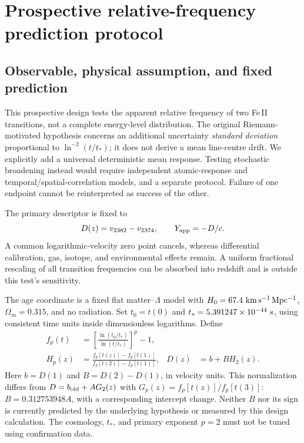 \section{Prospective relative-frequency prediction protocol}
\label{app:prediction}

\subsection{Observable, physical assumption, and fixed prediction}
\label{app:prediction_model}

This prospective design tests the apparent relative frequency of two Fe\,II
transitions, not a complete energy-level distribution.  The original
Riemann-motivated hypothesis concerns an additional uncertainty \emph{standard
deviation} proportional to $\ln^{-2}(t/t_*)$; it does not derive a mean line-centre
drift.  We explicitly add a universal deterministic mean response.  Testing
stochastic broadening instead would require independent atomic-response and
temporal/spatial-correlation models, and a separate protocol.  Failure of one
endpoint cannot be reinterpreted as success of the other.

The primary descriptor is fixed to
\begin{equation}
 D(z)=v_{2382}-v_{2374},\qquad Y_{\rm app}=-D/c.
 \label{app:descriptor}
\end{equation}
A common logarithmic-velocity zero point cancels, whereas differential
calibration, gas, isotope, and environmental effects remain.  A uniform
fractional rescaling of all transition frequencies can be absorbed into
redshift and is outside this test's sensitivity.

The age coordinate is a fixed flat matter--$\Lambda$ model with
$H_0=67.4\ {\rm km\,s^{-1}\,Mpc^{-1}}$, $\Omega_m=0.315$, and no radiation.
Set $t_0=t(0)$ and $t_*=5.391247\times10^{-44}\ {\rm s}$, using consistent time
units inside dimensionless logarithms.  Define
\begin{align}
 f_p(t)&=\left[\frac{\ln(t_0/t_*)}{\ln(t/t_*)}\right]^p-1,
 \label{app:time_function}\\
 H_p(z)&=\frac{f_p[t(z)]-f_p[t(1)]}{f_p[t(2)]-f_p[t(1)]},
 &D(z)&=b+B H_2(z).
 \label{app:endpoint_model}
\end{align}
Here $b=D(1)$ and $B=D(2)-D(1)$, in velocity units.  This normalization differs
from $D=b_{\rm old}+A G_2(z)$ with $G_p(z)=f_p[t(z)]/f_p[t(3)]$:
$B=0.312753948A$, with a corresponding intercept change.  Neither $B$ nor its
sign is currently predicted by the underlying hypothesis or measured by this
design calculation.  The cosmology, $t_*$, and primary exponent $p=2$ must not
be tuned using confirmation data.

